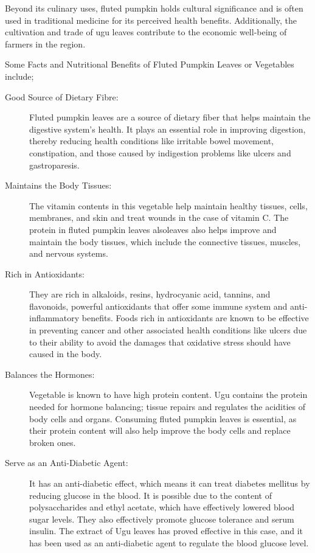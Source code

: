Beyond its culinary uses, fluted pumpkin holds cultural significance and is often used in traditional medicine for its perceived health benefits. Additionally, the cultivation and trade of ugu leaves contribute to the economic well-being of farmers in the region.

Some Facts and Nutritional Benefits of Fluted Pumpkin Leaves or Vegetables include;
\begin{description}
	\item[Good Source of Dietary Fibre:] Fluted pumpkin leaves are a source of dietary fiber that helps maintain the digestive system’s health. It plays an essential role in improving digestion, thereby reducing health conditions like irritable bowel movement, constipation, and those caused by indigestion problems like ulcers and gastroparesis.
	
	\item[Maintains the Body Tissues:] The vitamin contents in this vegetable help maintain healthy tissues, cells, membranes, and skin and treat wounds in the case of vitamin C. The protein in fluted pumpkin leaves alsoleaves also helps improve and maintain the body tissues, which include the connective tissues, muscles, and nervous systems.
	
	\item[Rich in Antioxidants:] They are rich in alkaloids, resins, hydrocyanic acid, tannins, and flavonoids, powerful antioxidants that offer some immune system and anti-inflammatory benefits. Foods rich in antioxidants are known to be effective in preventing cancer and other associated health conditions like ulcers due to their ability to avoid the damages that oxidative stress should have caused in the body.
	
	\item[Balances the Hormones:] 
	Vegetable is known to have high protein content. Ugu contains the protein needed for hormone balancing; tissue repairs and regulates the acidities of body cells and organs. Consuming fluted pumpkin leaves is essential, as their protein content will also help improve the body cells and replace broken ones.
	
	\item[Serve as an Anti-Diabetic Agent:] It has an anti-diabetic effect, which means it can treat diabetes mellitus by reducing glucose in the blood. It is possible due to the content of polysaccharides and ethyl acetate, which have effectively lowered blood sugar levels. They also effectively promote glucose tolerance and serum insulin. The extract of Ugu leaves has proved effective in this case, and it has been used as an anti-diabetic agent to regulate the blood glucose level.
	

\end{description}
